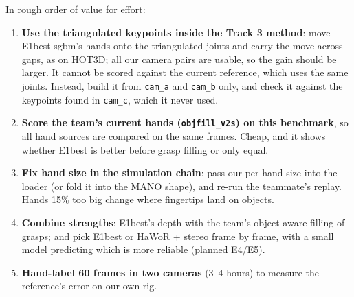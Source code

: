 \documentclass[10pt]{article}
\newcommand{\sect}[1]{\vspace{3pt}{\large\bfseries #1}\par\vspace{1pt}}
\begin{document}
\sect{6. Next steps} In rough order of value for effort:
\begin{enumerate}[leftmargin=1.4em]
\item \textbf{Use the triangulated keypoints inside the Track 3 method}: move E1best-sgbm's hands onto the triangulated
joints and carry the move across gaps, as on HOT3D; all our camera pairs are usable, so the gain should be larger. It
cannot be scored against the current reference, which uses the same joints. Instead, build it from \texttt{cam\_a} and
\texttt{cam\_b} only, and check it against the keypoints found in \texttt{cam\_c}, which it never used.
\item \textbf{Score the team's current hands (\texttt{objfill\_v2s}) on this benchmark}, so all hand sources are
compared on the same frames. Cheap, and it shows whether E1best is better before grasp filling or only equal.
\item \textbf{Fix hand size in the simulation chain}: pass our per-hand size into the loader (or fold it into the MANO
shape), and re-run the teammate's replay. Hands 15\% too big change where fingertips land on objects.
\item \textbf{Combine strengths}: E1best's depth with the team's object-aware filling of grasps; and pick E1best or
HaWoR + stereo frame by frame, with a small model predicting which is more reliable (planned E4/E5).
\item \textbf{Hand-label 60 frames in two cameras} (3--4 hours) to measure the reference's error on our own rig.
\end{enumerate}

\clearpage
\end{document}
